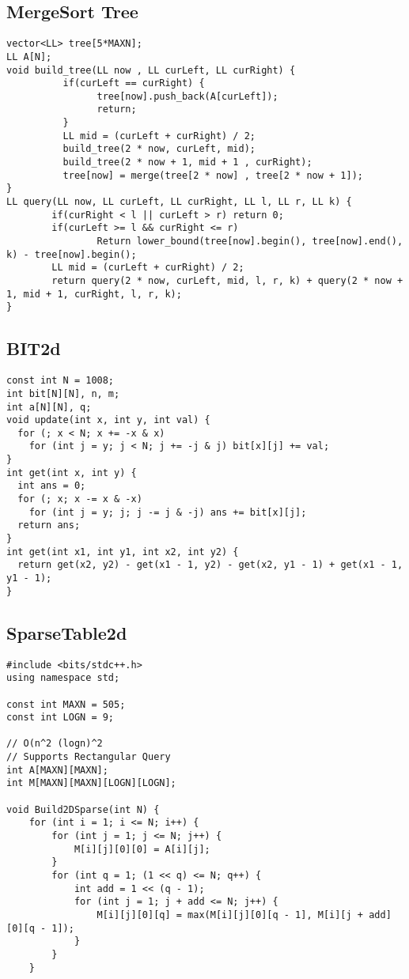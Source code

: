 \documentclass[FSZ,a4paper,onesided]{article}
\begin{document}
\begin{multicols*}{\COLS}
\subsection{MergeSort Tree}
\begin{lstlisting}
vector<LL> tree[5*MAXN];
LL A[N];
void build_tree(LL now , LL curLeft, LL curRight) {
          if(curLeft == curRight) {
                tree[now].push_back(A[curLeft]);
                return;
          }
          LL mid = (curLeft + curRight) / 2;
          build_tree(2 * now, curLeft, mid);
          build_tree(2 * now + 1, mid + 1 , curRight);
          tree[now] = merge(tree[2 * now] , tree[2 * now + 1]);
}
LL query(LL now, LL curLeft, LL curRight, LL l, LL r, LL k) {
        if(curRight < l || curLeft > r) return 0;
        if(curLeft >= l && curRight <= r)
                Return lower_bound(tree[now].begin(), tree[now].end(), k) - tree[now].begin();
        LL mid = (curLeft + curRight) / 2;
        return query(2 * now, curLeft, mid, l, r, k) + query(2 * now + 1, mid + 1, curRight, l, r, k);
}\end{lstlisting}
\subsection{BIT2d}
\begin{lstlisting}
const int N = 1008;
int bit[N][N], n, m;
int a[N][N], q;
void update(int x, int y, int val) {
  for (; x < N; x += -x & x)
    for (int j = y; j < N; j += -j & j) bit[x][j] += val;
}
int get(int x, int y) {
  int ans = 0;
  for (; x; x -= x & -x)
    for (int j = y; j; j -= j & -j) ans += bit[x][j];
  return ans;
}
int get(int x1, int y1, int x2, int y2) {
  return get(x2, y2) - get(x1 - 1, y2) - get(x2, y1 - 1) + get(x1 - 1, y1 - 1);
}
\end{lstlisting}
\subsection{SparseTable2d}
\begin{lstlisting}
#include <bits/stdc++.h>
using namespace std;

const int MAXN = 505;
const int LOGN = 9;

// O(n^2 (logn)^2
// Supports Rectangular Query
int A[MAXN][MAXN];
int M[MAXN][MAXN][LOGN][LOGN];

void Build2DSparse(int N) {
    for (int i = 1; i <= N; i++) {
        for (int j = 1; j <= N; j++) {
            M[i][j][0][0] = A[i][j];
        }
        for (int q = 1; (1 << q) <= N; q++) {
            int add = 1 << (q - 1);
            for (int j = 1; j + add <= N; j++) {
                M[i][j][0][q] = max(M[i][j][0][q - 1], M[i][j + add][0][q - 1]);
            }
        }
    }


\end{lstlisting}
\end{multicols*}
\end{document}
